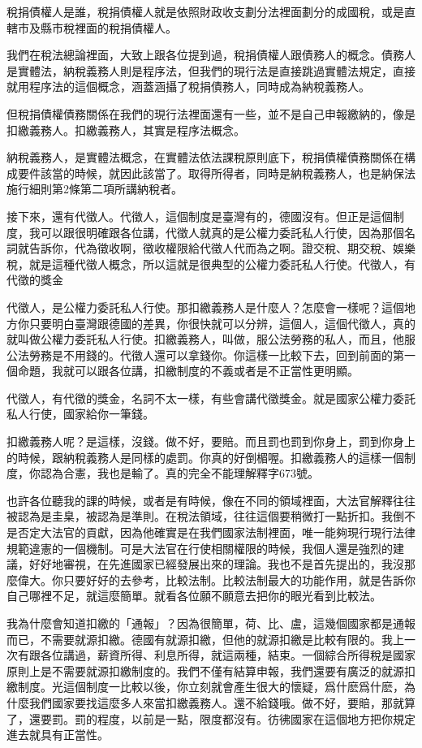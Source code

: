 \documentclass[]{ctexbook}
\begin{document}
稅捐債權人是誰，稅捐債權人就是依照財政收支劃分法裡面劃分的成國稅，或是直轄市及縣市稅裡面的稅捐債權人。

我們在稅法總論裡面，大致上跟各位提到過，稅捐債權人跟債務人的概念。債務人是實體法，納稅義務人則是程序法，但我們的現行法是直接跳過實體法規定，直接就用程序法的這個概念，涵蓋涵攝了稅捐債務人，同時成為納稅義務人。

但稅捐債權債務關係在我們的現行法裡面還有一些，並不是自己申報繳納的，像是扣繳義務人。扣繳義務人，其實是程序法概念。

納稅義務人，是實體法概念，在實體法依法課稅原則底下，稅捐債權債務關係在構成要件該當的時候，就因此該當了。取得所得者，同時是納稅義務人，也是納保法施行細則第2條第二項所講納稅者。

接下來，還有代徵人。代徵人，這個制度是臺灣有的，德國沒有。但正是這個制度，我可以跟很明確跟各位講，代徵人就真的是公權力委託私人行使，因為那個名詞就告訴你，代為徵收啊，徵收權限給代徵人代而為之啊。證交稅、期交稅、娛樂稅，就是這種代徵人概念，所以這就是很典型的公權力委託私人行使。代徵人，有代徵的獎金

代徵人，是公權力委託私人行使。那扣繳義務人是什麼人？怎麼會一樣呢？這個地方你只要明白臺灣跟德國的差異，你很快就可以分辨，這個人，這個代徵人，真的就叫做公權力委託私人行使。扣繳義務人，叫做，服公法勞務的私人，而且，他服公法勞務是不用錢的。代徵人還可以拿錢你。你這樣一比較下去，回到前面的第一個命題，我就可以跟各位講，扣繳制度的不義或者是不正當性更明顯。

代徵人，有代徵的獎金，名詞不太一樣，有些會講代徵獎金。就是國家公權力委託私人行使，國家給你一筆錢。

扣繳義務人呢？是這樣，沒錢。做不好，要賠。而且罰也罰到你身上，罰到你身上的時候，跟納稅義務人是同樣的處罰。你真的好倒楣喔。扣繳義務人的這樣一個制度，你認為合憲，我也是輸了。真的完全不能理解釋字673號。

也許各位聽我的課的時候，或者是有時候，像在不同的領域裡面，大法官解釋往往被認為是圭臬，被認為是準則。在稅法領域，往往這個要稍微打一點折扣。我倒不是否定大法官的貢獻，因為他確實是在我們國家法制裡面，唯一能夠現行現行法律規範違憲的一個機制。可是大法官在行使相關權限的時候，我個人還是強烈的建議，好好地審視，在先進國家已經發展出來的理論。我也不是首先提出的，我沒那麼偉大。你只要好好的去參考，比較法制。比較法制最大的功能作用，就是告訴你自己哪裡不足，就這麼簡單。就看各位願不願意去把你的眼光看到比較法。

我為什麼會知道扣繳的「通報」？因為很簡單，荷、比、盧，這幾個國家都是通報而已，不需要就源扣繳。德國有就源扣繳，但他的就源扣繳是比較有限的。我上一次有跟各位講過，薪資所得、利息所得，就這兩種，結束。一個綜合所得稅是國家原則上是不需要就源扣繳制度的。我們不僅有結算申報，我們還要有廣泛的就源扣繳制度。光這個制度一比較以後，你立刻就會產生很大的懷疑，爲什麽爲什麽，為什麼我們國家要找這麼多人來當扣繳義務人。還不給錢哦。做不好，要賠，那就算了，還要罰。罰的程度，以前是一點，限度都沒有。彷彿國家在這個地方把你規定進去就具有正當性。
\end{document}
